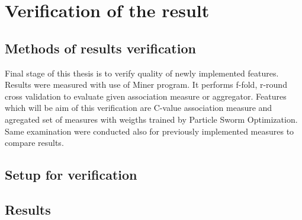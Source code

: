 \chapter{Verification of the result} \label{verification}

\section{Methods of results verification}
Final stage of this thesis is to verify quality of newly implemented features. Results were measured with use of Miner program. 
It performs f-fold, r-round cross validation to evaluate given association measure or aggregator. Features which will be aim of 
this verification are C-value association measure and agregated set of measures with weigths trained by Particle Sworm Optimization. 
Same examination were conducted also for previously implemented measures to compare results.

\section{Setup for verification}

\section{Results}